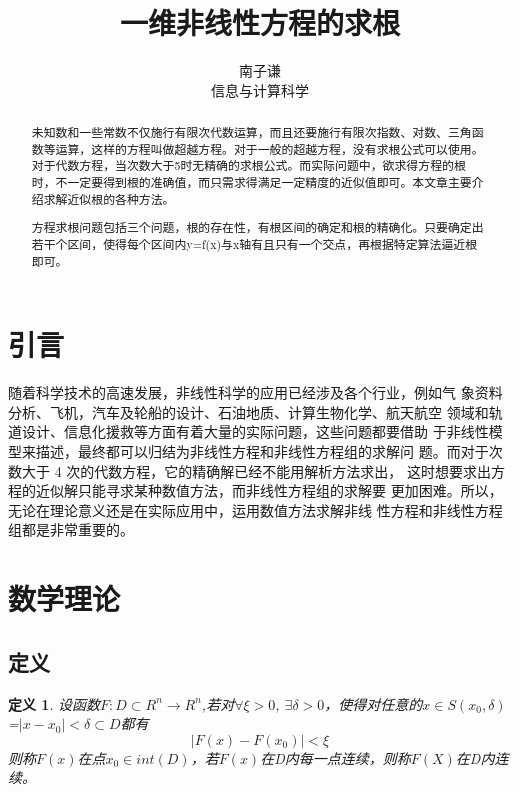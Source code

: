 \documentclass{ctexart}
\title{一维非线性方程的求根}
\author{南子谦 \\ 信息与计算科学\quad 3210104676}
\newtheorem{definition}{定义}
\begin{document}
\maketitle

\begin{abstract}
未知数和一些常数不仅施行有限次代数运算，而且还要施行有限次指数、对数、三角函数等运算，这样的方程叫做超越方程。对于一般的超越方程，没有求根公式可以使用。
对于代数方程，当次数大于5时无精确的求根公式。而实际问题中，欲求得方程的根时，不一定要得到根的准确值，而只需求得满足一定精度的近似值即可。本文章主要介绍求解近似根的各种方法。
\par 方程求根问题包括三个问题，根的存在性，有根区间的确定和根的精确化。只要确定出若干个区间，使得每个区间内y=f(x)与x轴有且只有一个交点，再根据特定算法逼近根即可。
\end{abstract}

\section{引言}
随着科学技术的高速发展，非线性科学的应用已经涉及各个行业，例如气
象资料分析、飞机，汽车及轮船的设计、石油地质、计算生物化学、航天航空
领域和轨道设计、信息化援救等方面有着大量的实际问题，这些问题都要借助
于非线性模型来描述，最终都可以归结为非线性方程和非线性方程组的求解问
题。而对于次数大于 4 次的代数方程，它的精确解已经不能用解析方法求出，
这时想要求出方程的近似解只能寻求某种数值方法，而非线性方程组的求解要
更加困难。所以，无论在理论意义还是在实际应用中，运用数值方法求解非线
性方程和非线性方程组都是非常重要的。

\section{数学理论}

\subsection{定义}
\begin{definition}
    设函数$F:D \subset R^n \rightarrow R^n$,若对$\forall \xi>0$, $\exists \delta>0$，使得对任意的$x \in S(x_0,\delta)$
    =${\left|x-x_0 \right|<\delta}\subset D$都有
\begin{equation}
    \left|F(x)-F(x_0)\right| < \xi
\end{equation}
则称$F(x)$在点$x_0 \in int(D)$，若$F(x)$在D内每一点连续，则称$F(X)$在D内连续。
\end{definition}
\end{document}
